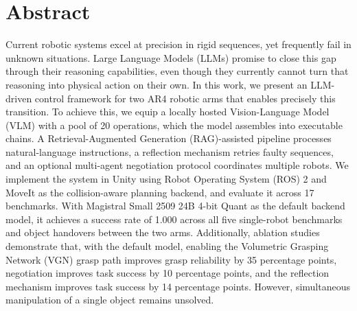 \documentclass[
     12pt,
     a4paper,
     BCOR=10mm,
     DIV=14,
     listof=totoc,
     bibliography=totoc,
     parskip,
     twoside,
     headsepline
     ]{scrreprt}
\begin{document}
\cleardoublepage

\section*{Abstract}
Current robotic systems excel at precision in rigid sequences, yet frequently fail in unknown situations. Large Language Models (LLMs) promise to close this gap through their reasoning capabilities, even though they currently cannot turn that reasoning into physical action on their own. In this work, we present an LLM-driven control framework for two AR4 robotic arms that enables precisely this transition. To achieve this, we equip a locally hosted Vision-Language Model (VLM) with a pool of 20 operations, which the model assembles into executable chains. A Retrieval-Augmented Generation (RAG)-assisted pipeline processes natural-language instructions, a reflection mechanism retries faulty sequences, and an optional multi-agent negotiation protocol coordinates multiple robots. We implement the system in Unity using Robot Operating System (ROS) 2 and MoveIt as the collision-aware planning backend, and evaluate it across 17 benchmarks. With Magistral Small 2509 24B 4-bit Quant as the default backend model, it achieves a success rate of 1.000 across all five single-robot benchmarks and object handovers between the two arms. Additionally, ablation studies demonstrate that, with the default model, enabling the Volumetric Grasping Network (VGN) grasp path improves grasp reliability by 35 percentage points, negotiation improves task success by 10 percentage points, and the reflection mechanism improves task success by 14 percentage points. However, simultaneous manipulation of a single object remains unsolved.

\clearpage
\end{document}
